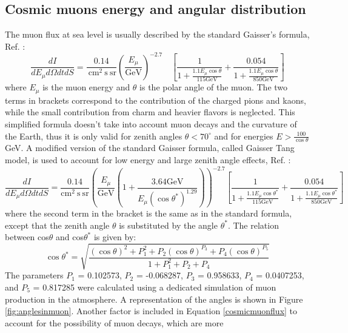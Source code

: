 \subsection{Cosmic muons energy and angular distribution}\label{distcos}
The muon flux at sea level is usually described by the standard Gaisser's formula, Ref. \cite{guan2015parametrization}:
\begin{equation}
    \frac{d I}{d E_\mu d \Omega d t d S}=\frac{0.14}{\mathrm{~cm}^2 \mathrm{~s} \ \mathrm{sr}}\left(\frac{E_\mu}{\mathrm{GeV}}\right)^{-2.7} \quad\left[\frac{1}{1+\frac{1.1 E_\mu \cos \theta}{115 \mathrm{GeV}}}+\frac{0.054}{1+\frac{1.1 E_\mu \cos \theta}{850 \mathrm{GeV}}}\right]
    \end{equation}
where $E_\mu$ is the muon energy and $\theta$ is the polar angle of the muon. 
The two terms in brackets correspond to the contribution of the charged pions and kaons, while 
the small contribution from charm and heavier flavors is neglected. 
This simplified formula doesn't take into account muon decays and the curvature of the Earth, 
thus it is only valid for zenith angles $\theta < 70^\circ$ and for energies $E > \frac{100}{\cos \theta}$ GeV.
A modified version of the standard Gaisser formula, called Gaisser Tang model, is used to account for low energy and large zenith angle effects, Ref. \cite{guan2015parametrization}:
\begin{equation}\label{cosmicmuonflux}
    \frac{d I}{d E_\mu d \Omega d t d S}=\frac{0.14}{\mathrm{cm}^2 \mathrm{~s} \ \mathrm{sr} }\left( \frac{E_\mu}{\mathrm{GeV}} \left(1+\frac{3.64 \mathrm{GeV}}{E_\mu\left(\cos \theta^*\right)^{1.29}}\right)\right)^{-2.7}\left[\frac{1}{1+\frac{1.1 E_\mu \cos \theta^*}{115 \mathrm{GeV}}}+\frac{0.054}{1+\frac{1.1 E_\mu \cos \theta^*}{850 \mathrm{GeV}}}\right]
\end{equation}
where the second term in the bracket is the same as in the standard formula, except that the zenith angle 
$\theta$ is substituted by the angle $\theta^*$. The relation between cos$\theta$
and cos$\theta^*$ is given by:
\begin{equation}
    \cos \theta^*=\sqrt{\frac{(\cos \theta)^2+P_1^2+P_2(\cos \theta)^{P_3}+P_4(\cos \theta)^{P_5}}{1+P_1^2+P_2+P_4}}
    \end{equation}
The parameters $P_1$ = 0.102573, $P_2$ = -0.068287, $P_3$ = 0.958633, $P_4$ = 0.0407253, and $P_5$ = 0.817285 were calculated using 
a dedicated simulation of muon production in the atmosphere. A representation of the angles is shown in Figure \ref{fig:anglesinmuon}.
Another factor is included in Equation \ref{cosmicmuonflux} to account for the possibility of muon decays, which are more 
